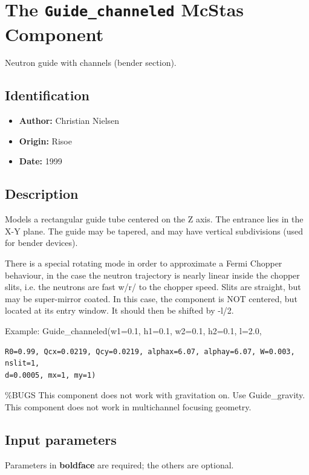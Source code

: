 \section{The \texttt{Guide\_channeled} McStas Component}
Neutron guide with channels (bender section).

\subsection*{Identification}
\begin{itemize}
  \item \textbf{Author:} Christian Nielsen
  \item \textbf{Origin:} Risoe
  \item \textbf{Date:} 1999
\end{itemize}

\subsection*{Description}
Models a rectangular guide tube centered on the Z axis. The entrance lies in the X-Y plane. The guide may be tapered, and may have vertical subdivisions (used for bender devices).

There is a special rotating mode in order to approximate a Fermi Chopper behaviour, in the case the neutron trajectory is nearly linear inside the chopper slits, i.e. the neutrons are fast w/r/ to the chopper speed. Slits are straight, but may be super-mirror coated. In this case, the component is NOT centered, but located at its entry window. It should then be shifted by -l/2.

Example: Guide\_channeled(w1=0.1, h1=0.1, w2=0.1, h2=0.1, l=2.0,

\begin{verbatim}
R0=0.99, Qcx=0.0219, Qcy=0.0219, alphax=6.07, alphay=6.07, W=0.003, nslit=1,
d=0.0005, mx=1, my=1)
\end{verbatim}

\%BUGS This component does not work with gravitation on. Use Guide\_gravity. This component does not work in multichannel focusing geometry.

\subsection*{Input parameters}
Parameters in \textbf{boldface} are required; the others are optional.


